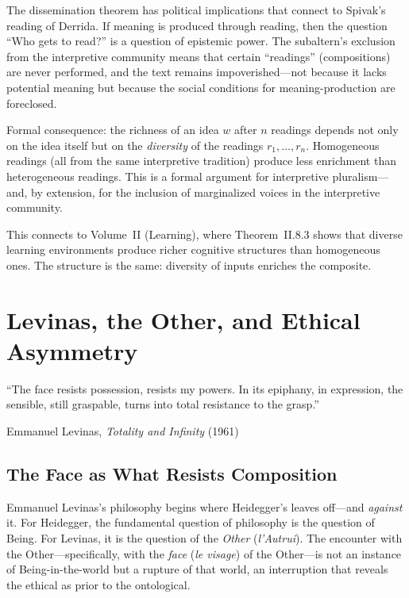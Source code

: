 \begin{remark}
The dissemination theorem has political implications that connect to Spivak's
reading of Derrida. If meaning is produced through reading, then the question
``Who gets to read?'' is a question of epistemic power. The subaltern's
exclusion from the interpretive community means that certain ``readings''
(compositions) are never performed, and the text remains impoverished---not
because it lacks potential meaning but because the social conditions for
meaning-production are foreclosed.

Formal consequence: the richness of an idea $w$ after $n$ readings depends
not only on the idea itself but on the \emph{diversity} of the readings
$r_1, \ldots, r_n$. Homogeneous readings (all from the same interpretive
tradition) produce less enrichment than heterogeneous readings. This is a
formal argument for interpretive pluralism---and, by extension, for the
inclusion of marginalized voices in the interpretive community.

This connects to Volume~II (Learning), where Theorem~II.8.3 shows that
diverse learning environments produce richer cognitive structures than
homogeneous ones. The structure is the same: diversity of inputs enriches
the composite.
\end{remark}



\chapter{Levinas, the Other, and Ethical Asymmetry}
\label{ch:levinas}

\epigraph{``The face resists possession, resists my powers. In its epiphany,
in expression, the sensible, still graspable, turns into total resistance to
the grasp.''}{Emmanuel Levinas, \textit{Totality and Infinity} (1961)}

\section{The Face as What Resists Composition}

Emmanuel Levinas's philosophy begins where Heidegger's leaves off---and
\emph{against} it. For Heidegger, the fundamental question of philosophy is the
question of Being. For Levinas, it is the question of the \emph{Other}
(\textit{l'Autrui}). The encounter with the Other---specifically, with the
\emph{face} (\textit{le visage}) of the Other---is not an instance of
Being-in-the-world but a rupture of that world, an interruption that reveals
the ethical as prior to the ontological.

